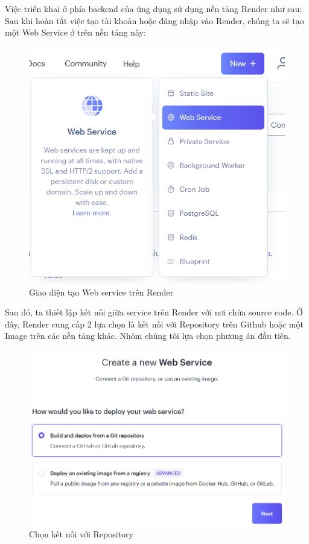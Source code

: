 Việc triển khai ở phía backend của ứng dụng sử dụng nền tảng Render như sau:
\newline
Sau khi hoàn tất việc tạo tài khoản hoặc đăng nhập vào Render, chúng ta sẽ tạo một Web Service ở trên nền tảng này:
\begin{figure}[H]
    \centering
    \includegraphics[width=\linewidth]{Content/Hiện thực hệ thống/images/Webservice.png}
    \caption{Giao diện tạo Web service trên Render}
    \label{fig:Tạo Web service}
\end{figure}
Sau đó, ta thiết lập kết nối giữa service trên Render với nơi chứa source code. Ở đây, Render cung cấp 2 lựa chọn là kết nối với Repository trên Github hoặc một Image trên các nền tảng khác. Nhóm chúng tôi lựa chọn phương án đầu tiên.
\begin{figure}[H]
    \centering
    \includegraphics[width=\linewidth]{Content/Hiện thực hệ thống/images/gitrepo.png}
    \caption{Chọn kết nối với Repository}
    \label{fig:Chọn kết nối với Repository}
\end{figure}
